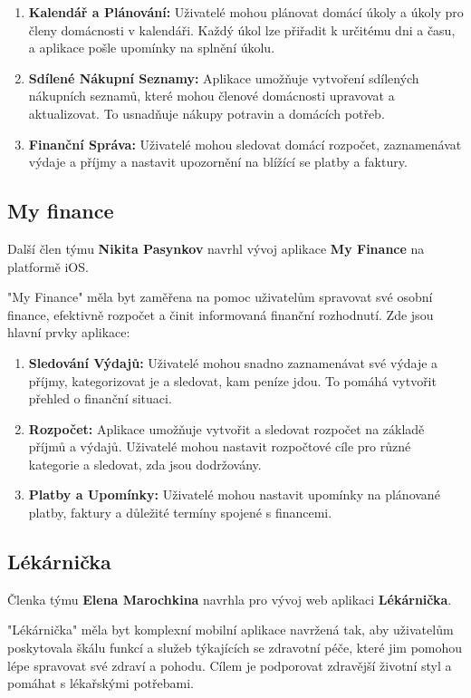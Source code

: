 \documentclass[a4paper, 11pt]{article}
\begin{document}
\begin{enumerate}
    \item \textbf{Kalendář a Plánování:} Uživatelé mohou plánovat domácí úkoly a úkoly pro členy domácnosti v kalendáři. Každý úkol lze přiřadit k určitému dni a času, a aplikace pošle upomínky na splnění úkolu.
    \item \textbf{Sdílené Nákupní Seznamy:} Aplikace umožňuje vytvoření sdílených nákupních seznamů, které mohou členové domácnosti upravovat a aktualizovat. To usnadňuje nákupy potravin a domácích potřeb.
    \item \textbf{Finanční Správa:} Uživatelé mohou sledovat domácí rozpočet, zaznamenávat výdaje a příjmy a nastavit upozornění na blížící se platby a faktury.
\end{enumerate}

 \subsection{My finance}
Další člen týmu \textbf{Nikita Pasynkov} navrhl vývoj aplikace \textbf{My Finance} na platformě iOS.

"My Finance" měla byt zaměřena na pomoc uživatelům spravovat své osobní finance, efektivně rozpočet a činit informovaná finanční rozhodnutí.
Zde jsou hlavní prvky aplikace:

\begin{enumerate}
    \item \textbf{Sledování Výdajů:} Uživatelé mohou snadno zaznamenávat své výdaje a příjmy, kategorizovat je a sledovat, kam peníze jdou. To pomáhá vytvořit přehled o finanční situaci.
    \item \textbf{Rozpočet:} Aplikace umožňuje vytvořit a sledovat rozpočet na základě příjmů a výdajů. Uživatelé mohou nastavit rozpočtové cíle pro různé kategorie a sledovat, zda jsou dodržovány.
    \item \textbf{Platby a Upomínky:} Uživatelé mohou nastavit upomínky na plánované platby, faktury a důležité termíny spojené s financemi.
\end{enumerate}

\subsection{Lékárnička}
 Členka týmu \textbf{Elena Marochkina} navrhla pro vývoj web aplikaci \textbf{Lékárnička}.

 "Lékárnička" měla byt komplexní mobilní aplikace navržená tak, aby uživatelům poskytovala škálu funkcí a služeb týkajících se zdravotní péče, které jim pomohou lépe spravovat své zdraví a pohodu. Cílem je podporovat zdravější životní styl a pomáhat s lékařskými potřebami.
\end{document}
